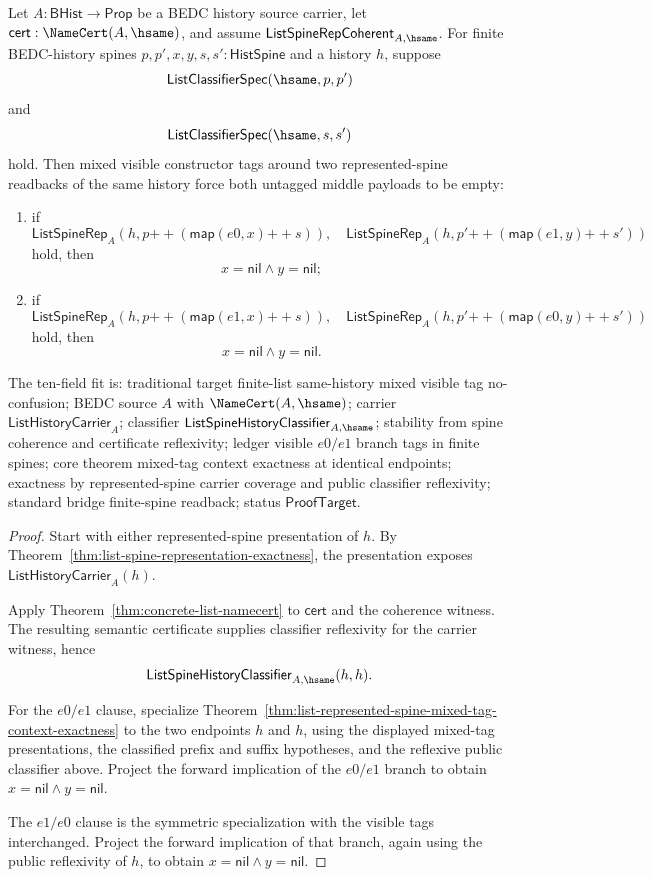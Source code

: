 \begin{theorem}
\label{thm:list-represented-spine-mixed-tag-same-history-emptiness}
Let $A:\mathsf{BHist}\to\mathsf{Prop}$ be a BEDC history source carrier, let
$\mathsf{cert}:\NameCert(A,\hsame)$, and assume
$\mathsf{ListSpineRepCoherent}_{A,\hsame}$. For finite BEDC-history spines
$p,p',x,y,s,s':\mathsf{HistSpine}$ and a history $h$, suppose
$$
\mathsf{ListClassifierSpec}(\hsame,p,p')
$$
and
$$
\mathsf{ListClassifierSpec}(\hsame,s,s')
$$
hold. Then mixed visible constructor tags around two represented-spine readbacks
of the same history force both untagged middle payloads to be empty:
\begin{enumerate}
  \item if
  $$
  \mathsf{ListSpineRep}_A(h,p{++}(\mathsf{map}(e0,x){++}s)),
  \quad
  \mathsf{ListSpineRep}_A(h,p'{++}(\mathsf{map}(e1,y){++}s'))
  $$
  hold, then
  $$
  x=\mathsf{nil}\land y=\mathsf{nil};
  $$
  \item if
  $$
  \mathsf{ListSpineRep}_A(h,p{++}(\mathsf{map}(e1,x){++}s)),
  \quad
  \mathsf{ListSpineRep}_A(h,p'{++}(\mathsf{map}(e0,y){++}s'))
  $$
  hold, then
  $$
  x=\mathsf{nil}\land y=\mathsf{nil}.
  $$
\end{enumerate}

The ten-field fit is: traditional target finite-list same-history mixed visible
tag no-confusion; BEDC source $A$ with $\NameCert(A,\hsame)$; carrier
$\mathsf{ListHistoryCarrier}_A$; classifier
$\mathsf{ListSpineHistoryClassifier}_{A,\hsame}$; stability from spine
coherence and certificate reflexivity; ledger visible $e0/e1$ branch tags in
finite spines; core theorem mixed-tag context exactness at identical endpoints;
exactness by represented-spine carrier coverage and public classifier
reflexivity; standard bridge finite-spine readback; status
$\mathsf{ProofTarget}$.
\end{theorem}
\begin{proof}
Start with either represented-spine presentation of $h$. By
Theorem~\ref{thm:list-spine-representation-exactness}, the presentation exposes
$\mathsf{ListHistoryCarrier}_A(h)$.

Apply Theorem~\ref{thm:concrete-list-namecert} to $\mathsf{cert}$ and the
coherence witness. The resulting semantic certificate supplies classifier
reflexivity for the carrier witness, hence
$$
\mathsf{ListSpineHistoryClassifier}_{A,\hsame}(h,h).
$$

For the $e0/e1$ clause, specialize
Theorem~\ref{thm:list-represented-spine-mixed-tag-context-exactness} to the two
endpoints $h$ and $h$, using the displayed mixed-tag presentations, the
classified prefix and suffix hypotheses, and the reflexive public classifier
above. Project the forward implication of the $e0/e1$ branch to obtain
$x=\mathsf{nil}\land y=\mathsf{nil}$.

The $e1/e0$ clause is the symmetric specialization with the visible tags
interchanged. Project the forward implication of that branch, again using the
public reflexivity of $h$, to obtain $x=\mathsf{nil}\land y=\mathsf{nil}$.
\end{proof}

